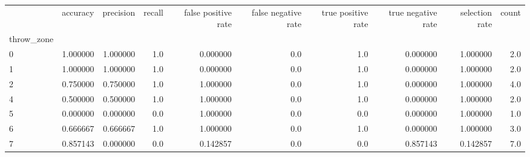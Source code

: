 \begin{tabular}{lrrrrrrrrr}
\toprule
{} &  accuracy &  precision &  recall &  false positive rate &  false negative rate &  true positive rate &  true negative rate &  selection rate &  count \\
throw\_zone &           &            &         &                      &                      &                     &                     &                 &        \\
\midrule
0          &  1.000000 &   1.000000 &     1.0 &             0.000000 &                  0.0 &                 1.0 &            0.000000 &        1.000000 &    2.0 \\
1          &  1.000000 &   1.000000 &     1.0 &             0.000000 &                  0.0 &                 1.0 &            0.000000 &        1.000000 &    2.0 \\
2          &  0.750000 &   0.750000 &     1.0 &             1.000000 &                  0.0 &                 1.0 &            0.000000 &        1.000000 &    4.0 \\
4          &  0.500000 &   0.500000 &     1.0 &             1.000000 &                  0.0 &                 1.0 &            0.000000 &        1.000000 &    2.0 \\
5          &  0.000000 &   0.000000 &     0.0 &             1.000000 &                  0.0 &                 0.0 &            0.000000 &        1.000000 &    1.0 \\
6          &  0.666667 &   0.666667 &     1.0 &             1.000000 &                  0.0 &                 1.0 &            0.000000 &        1.000000 &    3.0 \\
7          &  0.857143 &   0.000000 &     0.0 &             0.142857 &                  0.0 &                 0.0 &            0.857143 &        0.142857 &    7.0 \\
\bottomrule
\end{tabular}
